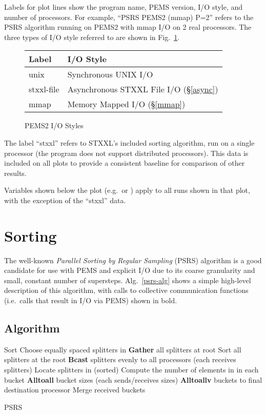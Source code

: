 \documentclass[12pt]{carletoncsthesis}
\begin{document}
Labels for plot lines show the program name, PEMS version, I/O style,
and number of processors.  For example, ``PSRS PEMS2 (mmap) P=2'' refers
to the PSRS algorithm running on PEMS2 with mmap I/O on 2 real processors.
The three types of I/O style referred to are shown in Fig.~\ref{io-styles}.
\begin{figure}[ht]
\begin{center}
\begin{tabular}{l|l}
Label & I/O Style \\ \hline
unix & Synchronous UNIX I/O \\
stxxl-file & Asynchronous STXXL File I/O (\S\ref{async}) \\
mmap & Memory Mapped I/O (\S\ref{mmap}) \\
\end{tabular}
\label{io-styles}
\caption{PEMS2 I/O Styles}
\end{center}
\end{figure}

The label ``stxxl'' refers to STXXL's included sorting algorithm, run on
a single processor (the program does not support distributed processors).
This data is included on all plots to provide a consistent baseline for
comparison of other results.

Variables shown below the plot (e.g.\  or ) apply to all
runs shown in that plot, with the exception of the ``stxxl'' data.

\clearpage
\section{Sorting}
\label{psrs-sec}


The well-known {\em Parallel Sorting by Regular Sampling} \cite{psrs}
(PSRS) algorithm is a good candidate for use with PEMS and explicit I/O
due to its coarse granularity and small, constant number of supersteps.
Alg.~\ref{psrs-alg} shows a simple high-level description of this algorithm,
with calls to collective communication functions (i.e.\ calls that result in
I/O via PEMS) shown in bold.

\subsection{Algorithm}


\begin{algorithm}[ht]
\BlankLine
Sort \;
Choose  equally spaced splitters in \;
{\bf Gather} all  splitters at root\;
Sort all  splitters at the root\;
{\bf Bcast} splitters evenly to all processors (each receives  splitters)\;
Locate splitters in (sorted) \;
Compute the number of elements in  in each bucket\;
{\bf Alltoall} bucket sizes (each sends/receives  sizes)\;
{\bf Alltoallv} buckets to final destination processor\;
Merge received buckets\;
\caption{\sc PSRS}
\label{psrs-alg}
\end{algorithm}
\end{document}
